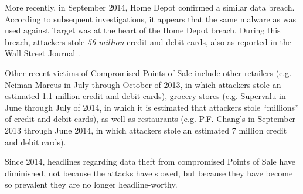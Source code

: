More recently, in September 2014, Home Depot confirmed a similar data breach.
According to subsequent investigations, it appears that the same malware as was used against Target was at the heart of the Home Depot breach.
During this breach, attackers stole \emph{56 million} credit and debit cards, also as reported in the Wall Street Journal \cite{homedepothack}.

Other recent victims of Compromised Points of Sale include other retailers
	(e.g. Neiman Marcus in July through October of 2013, in which attackers stole an estimated 1.1 million credit and debit cards)\cite{neimanmarcushack},
	grocery stores (e.g. Supervalu in June through July of 2014, in which it is estimated that attackers stole ``millions'' of credit and debit cards\cite{supervaluhack}),
	as well as restaurants (e.g. P.F. Chang's in September 2013 through June 2014, in which attackers stole an estimated 7 million credit and debit cards\cite{pfchanghack}).

Since 2014, headlines regarding data theft from compromised Points of Sale have diminished,
    not because the attacks have slowed, but because they have become so prevalent they are no longer headline-worthy.
